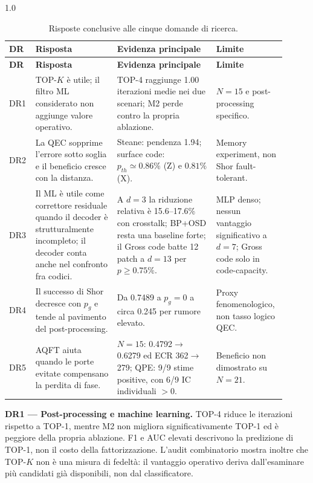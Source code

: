 \begingroup
\footnotesize
\begin{spacing}{1.0}
\begin{longtable}[]{@{}
  >{\raggedright\arraybackslash}p{0.07\linewidth}
  >{\raggedright\arraybackslash}p{0.29\linewidth}
  >{\raggedright\arraybackslash}p{0.34\linewidth}
  >{\raggedright\arraybackslash}p{0.215\linewidth}@{}}
\caption{Risposte conclusive alle cinque domande di ricerca.}\label{tab:finale_6_1}\\
\toprule
\textbf{DR} & \textbf{Risposta} & \textbf{Evidenza principale} & \textbf{Limite} \\
\midrule
\endfirsthead
\toprule
\textbf{DR} & \textbf{Risposta} & \textbf{Evidenza principale} & \textbf{Limite} \\
\midrule
\endhead
\bottomrule
\endlastfoot
DR1 & TOP-$K$ è utile; il filtro ML considerato non aggiunge valore operativo. & TOP-4 raggiunge 1.00 iterazioni medie nei due scenari; M2 perde contro la propria ablazione. & $N=15$ e post-processing specifico. \\
DR2 & La QEC sopprime l'errore sotto soglia e il beneficio cresce con la distanza. & Steane: pendenza 1.94; surface code: $p_{th}\simeq0.86\%$ (Z) e $0.81\%$ (X). & Memory experiment, non Shor fault-tolerant. \\
DR3 & Il ML è utile come correttore residuale quando il decoder è strutturalmente incompleto; il decoder conta anche nel confronto fra codici. & A $d=3$ la riduzione relativa è 15.6--17.6\% con crosstalk; BP+OSD resta una baseline forte; il Gross code batte 12 patch a $d=13$ per $p\ge0.75\%$. & MLP denso; nessun vantaggio significativo a $d=7$; Gross code solo in code-capacity. \\
DR4 & Il successo di Shor decresce con $p_g$ e tende al pavimento del post-processing. & Da 0.7489 a $p_g=0$ a circa 0.245 per rumore elevato. & Proxy fenomenologico, non tasso logico QEC. \\
DR5 & AQFT aiuta quando le porte evitate compensano la perdita di fase. & $N=15$: 0.4792$\to$0.6279 ed ECR 362$\to$279; QPE: 9/9 stime positive, con 6/9 IC individuali $>0$. & Beneficio non dimostrato su $N=21$. \\
\end{longtable}
\end{spacing}
\endgroup

\label{sec:finale_6_1_1}
\textbf{DR1 --- Post-processing e machine learning.}
TOP-4 riduce le iterazioni rispetto a TOP-1, mentre M2 non migliora significativamente TOP-1 ed è peggiore della propria ablazione. F1 e AUC elevati descrivono la predizione di TOP-1, non il costo della fattorizzazione. L'audit combinatorio mostra inoltre che TOP-$K$ non è una misura di fedeltà: il vantaggio operativo deriva dall'esaminare più candidati già disponibili, non dal classificatore.

